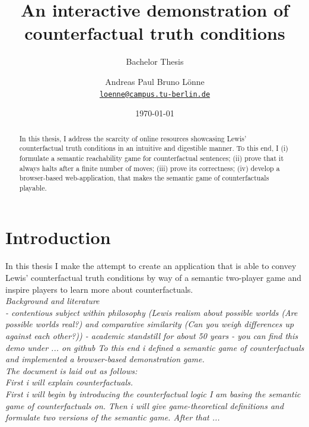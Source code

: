 \documentclass[a4paper,american,10pt]{paper}
\date{\today}
\providecommand*{\code}[1]{\texttt{#1}}
\theoremstyle{definition}\newtheorem{definition}{Definition}
\begin{document}
\title{An interactive demonstration of counterfactual truth conditions}

\subtitle{Bachelor Thesis}

\author{%
	Andreas Paul Bruno Lönne\\
	\code{\href{mailto:loenne@campus.tu-berlin.de}{loenne@campus.tu-berlin.de}}
}


\maketitle

\begin{abstract}
In this thesis, I address the scarcity of online resources showcasing Lewis' counterfactual truth conditions in an intuitive and digestible manner. To this end, I (i) formulate a semantic reachability game for counterfactual sentences; (ii) prove that it always halts after a finite number of moves; (iii) prove its correctness; (iv) develop a browser-based web-application, that makes the semantic game of counterfactuals playable.
\end{abstract}
\section{Introduction}
In this thesis I make the attempt to create an application that is able to convey Lewis' counterfactual truth conditions by way of a semantic two-player game and inspire players to learn more about counterfactuals.\\
\textit{Background and literature\\
- contentious subject within philosophy (Lewis realism about possible worlds (Are possible worlds real?) and comparative similarity (Can you weigh differences up against each other?))
- academic standstill for about 50 years
- you can find this demo under ... on github
To this end i defined a semantic game of counterfactuals and implemented a browser-based demonstration game.\\
The document is laid out as follows:\\
First i will explain counterfactuals.\\
First i will begin by introducing the counterfactual logic I am basing the semantic game of counterfactuals on. Then i will give game-theoretical definitions and formulate two versions of the semantic game. After that ...}
\end{document}
